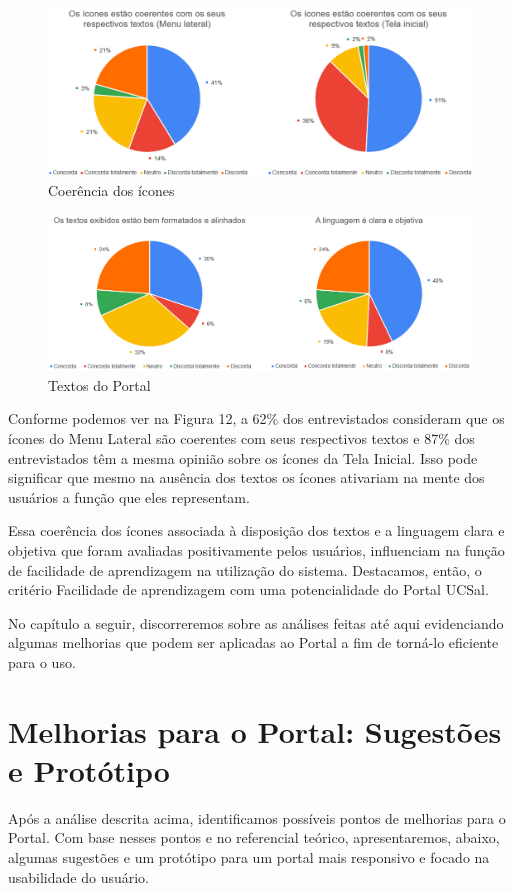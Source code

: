 \documentclass[12pt]{article}
\begin{document}
\begin{figure}[!htb]
\centering
\includegraphics[scale=0.4,frame]{img12.png}
\caption{Coerência dos ícones}
\label{fig:grafico9}
\end{figure}
\begin{figure}[!htb]
\centering
\includegraphics[scale=0.4,frame]{img13.png}
\caption{Textos do Portal}
\label{fig:grafico10}
\end{figure}
Conforme podemos ver na Figura 12, a 62\% dos entrevistados consideram que os ícones do Menu Lateral são coerentes com seus respectivos textos e 87\% dos entrevistados têm a mesma opinião sobre os ícones da Tela Inicial. Isso pode significar que mesmo na ausência dos textos os ícones ativariam na mente dos usuários a função que eles representam. 

Essa coerência dos ícones associada à disposição dos textos e a linguagem clara e objetiva que foram avaliadas positivamente pelos usuários, influenciam na função de facilidade de aprendizagem na utilização do sistema. Destacamos, então, o critério Facilidade de aprendizagem com uma potencialidade do Portal UCSal.

No capítulo a seguir, discorreremos sobre as análises feitas até aqui evidenciando algumas melhorias que podem ser aplicadas ao Portal a fim de torná-lo eficiente para o uso.


\section{Melhorias para o Portal: Sugestões e Protótipo\label{sec:sugestoesportal}}
Após a análise descrita acima, identificamos possíveis pontos de melhorias para o Portal.
Com base nesses pontos e no referencial teórico, apresentaremos, abaixo, algumas sugestões e um protótipo para um portal mais responsivo e focado na usabilidade do usuário. 
\end{document}
